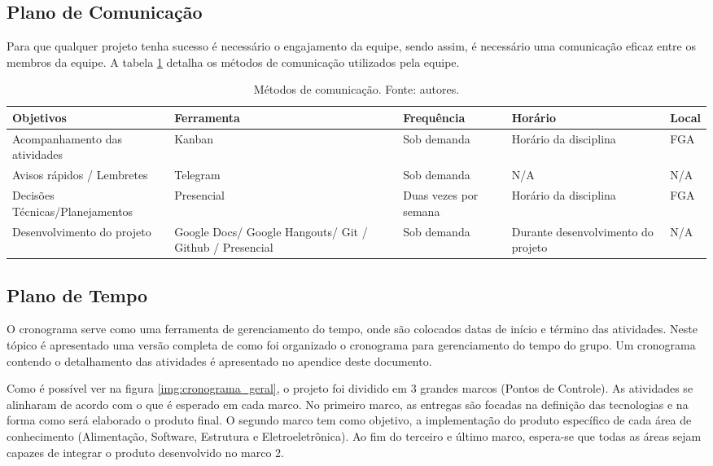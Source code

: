     \subsection{Plano de Comunicação}

      Para que qualquer projeto tenha sucesso é necessário o engajamento da equipe, sendo assim, é necessário uma comunicação eficaz entre os membros da equipe. A tabela \ref{tab:com} detalha os métodos de comunicação utilizados pela equipe.
      
      \begin{table}[!htbp]
      	\begin{center}
      		\caption{\label{tab:com}Métodos de comunicação. Fonte: autores.}
      		\begin{tabular}{|p{3.5cm}|p{3cm}|p{3cm}|p{3cm}|p{1cm}|}
      			\hline
      			\textbf{Objetivos} & \textbf{Ferramenta} & \textbf{Frequência} & \textbf{Horário} & \textbf{Local}\\\hline\hline
      			Acompanhamento das atividades & Kanban & Sob demanda & Horário da disciplina & FGA\\\hline
      			Avisos rápidos / Lembretes & Telegram & Sob demanda & N/A & N/A\\\hline
      			Decisões Técnicas/Planejamentos & Presencial & Duas vezes por semana & Horário da disciplina & FGA\\\hline
      			Desenvolvimento do projeto & Google Docs/ Google Hangouts/ Git / Github / Presencial & Sob demanda & Durante desenvolvimento do projeto & N/A\\\hline
      		\end{tabular}
      	\end{center}
      \end{table}

\newpage

    \subsection{Plano de Tempo}
	O cronograma serve como uma ferramenta de gerenciamento do tempo, onde são colocados datas de início e término das atividades. Neste tópico é apresentado uma versão completa de como foi organizado o cronograma para gerenciamento do tempo do grupo. Um cronograma contendo o detalhamento das atividades é apresentado no apendice deste documento.

	Como é possível ver na figura \ref{img:cronograma_geral}, o projeto foi dividido em 3 grandes marcos (Pontos de Controle). As atividades se alinharam de acordo com o que é esperado em cada marco. No primeiro marco, as entregas são focadas na definição das tecnologias e na forma como será elaborado o produto final. O segundo marco tem como objetivo, a implementação do produto específico de cada área de conhecimento (Alimentação, Software, Estrutura e Eletroeletrônica). Ao fim do terceiro e último marco, espera-se que todas as áreas sejam capazes de integrar o produto desenvolvido no marco 2. 

